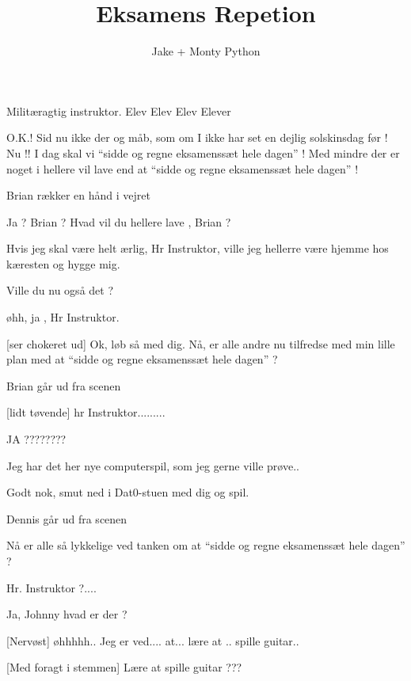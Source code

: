 \documentclass[a4paper,11pt]{article}
\title{Eksamens Repetion}
\author{Jake + Monty Python}
\begin{document}
\maketitle


\begin{roles}
 Militæragtig instruktor.
 Elev
 Elev
 Elev
 Elever
\end{roles}
\begin{sketch}
 	O.K.! Sid nu ikke der og måb, som om I ikke har set en
		dejlig solskinsdag før !
		Nu !!  I dag skal vi ``sidde og regne eksamenssæt hele dagen'' !
		Med mindre der er noget i hellere vil lave end at ``sidde og 
		regne eksamenssæt hele dagen'' !

\scene
 Brian rækker en  hånd i vejret

	Ja ? Brian ? Hvad vil du hellere lave , Brian ?


		Hvis jeg skal være helt ærlig, Hr Instruktor, ville
		jeg hellerre være hjemme hos kæresten og hygge mig.

	Ville du nu også det ?

		øhh, ja , Hr Instruktor.

[ser chokeret ud]
		Ok, løb så med dig. Nå, er alle andre nu tilfredse
		med min lille plan med at ``sidde og regne eksamenssæt 
		hele dagen'' ?

\scene
	Brian går ud fra scenen

[lidt tøvende]
		hr Instruktor.........

	JA ????????

		Jeg har det her nye computerspil, som jeg gerne ville prøve..

	Godt nok, smut ned i Dat0-stuen med dig og spil.

\scene
	Dennis går ud fra scenen


	Nå er alle så lykkelige ved tanken om at ``sidde og regne
		eksamenssæt hele dagen'' ?

		Hr. Instruktor ?....

	Ja, Johnny hvad er der ?

[Nervøst]
		øhhhhh.. Jeg er ved.... at... lære at .. spille guitar..

[Med foragt i stemmen]
		Lære at spille guitar ???


\end{sketch}
\end{document}
